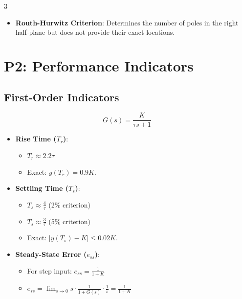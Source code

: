 \documentclass[letterpaper,10pt]{article}
\begin{document}
\begin{multicols}{3}
\begin{itemize}[leftmargin=*]
    \item \textbf{Routh-Hurwitz Criterion}: Determines the number of poles in the right half-plane but does not provide their exact locations.
\end{itemize}

\section*{P2: Performance Indicators}

\subsection*{First-Order Indicators}
\[
G(s) = \frac{K}{\tau s + 1}
\]
\begin{itemize}[leftmargin=*]
    \item \textbf{Rise Time (\(T_r\))}:
    \begin{itemize}[leftmargin=*]
            \item \( T_r \approx 2.2\tau \)
            \item Exact: \( y(T_r) = 0.9K \).
    \end{itemize}
    
    \item \textbf{Settling Time (\(T_s\))}:
    \begin{itemize}[leftmargin=*]
            \item \( T_s \approx \frac{4}{\tau} \) (2\% criterion)
            \item \( T_s \approx \frac{3}{\tau} \) (5\% criterion)
            \item Exact:  \( |y(T_s) - K| \leq 0.02K \).
    \end{itemize}
    
    \item \textbf{Steady-State Error (\(e_{ss}\))}:
        \begin{itemize}[leftmargin=*]
            \item For step input: \( e_{ss} = \frac{1}{1+K} \)
            \item \( e_{ss} = \lim_{s \to 0} s \cdot \frac{1}{1+G(s)} \cdot \frac{1}{s} = \frac{1}{1+K} \)
        \end{itemize}
\end{itemize}


\end{multicols}
\end{document}
